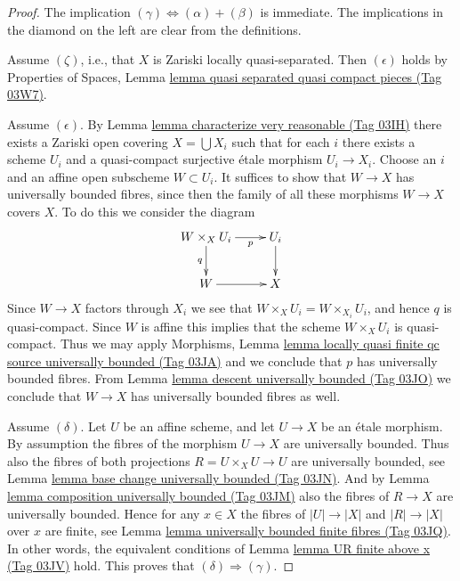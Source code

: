 \documentclass{amsart}
\theoremstyle{plain}
\theoremstyle{definition}
\theoremstyle{remark}
\numberwithin{equation}{subsection}
\begin{document}
\begin{proof}
The implication $(\gamma) \Leftrightarrow (\alpha) + (\beta)$ is immediate.
The implications in the diamond on the left are clear from the
definitions.

\medskip\noindent
Assume $(\zeta)$, i.e., that $X$ is Zariski locally quasi-separated.
Then $(\epsilon)$ holds by
Properties of Spaces, Lemma
\href{https://stacks.math.columbia.edu/tag/03W7}{lemma quasi separated quasi compact pieces (Tag 03W7)}.

\medskip\noindent
Assume $(\epsilon)$. By
Lemma \href{https://stacks.math.columbia.edu/tag/03IH}{lemma characterize very reasonable (Tag 03IH)}
there exists
a Zariski open covering $X = \bigcup X_i$ such that for each $i$
there exists a scheme $U_i$ and a quasi-compact surjective \'etale morphism
$U_i \to X_i$. Choose an $i$ and an affine open subscheme $W \subset U_i$.
It suffices to show that $W \to X$ has universally bounded fibres, since then
the family of all these morphisms $W \to X$ covers $X$.
To do this we consider the diagram
$$
\xymatrix{
W \times_X U_i \ar[r]_-p \ar[d]_q & U_i \ar[d] \\
W \ar[r] & X
}
$$
Since $W \to X$ factors through $X_i$ we see that
$W \times_X U_i = W \times_{X_i} U_i$, and hence $q$ is quasi-compact.
Since $W$ is affine this implies that the scheme $W \times_X U_i$
is quasi-compact. Thus we may apply
Morphisms, Lemma
\href{https://stacks.math.columbia.edu/tag/03JA}{lemma locally quasi finite qc source universally bounded (Tag 03JA)}
and we conclude that $p$ has universally bounded fibres. From
Lemma \href{https://stacks.math.columbia.edu/tag/03JO}{lemma descent universally bounded (Tag 03JO)}
we conclude that $W \to X$ has universally bounded fibres as well.

\medskip\noindent
Assume $(\delta)$. Let $U$ be an affine scheme, and let $U \to X$ be an \'etale
morphism. By assumption the fibres of the morphism $U \to X$ are universally
bounded. Thus also the fibres of both projections $R = U \times_X U \to U$
are universally bounded, see
Lemma \href{https://stacks.math.columbia.edu/tag/03JN}{lemma base change universally bounded (Tag 03JN)}.
And by
Lemma \href{https://stacks.math.columbia.edu/tag/03JM}{lemma composition universally bounded (Tag 03JM)}
also the fibres of $R \to X$ are universally bounded.
Hence for any $x \in X$ the fibres of $|U| \to |X|$ and $|R| \to |X|$
over $x$ are finite, see
Lemma \href{https://stacks.math.columbia.edu/tag/03JQ}{lemma universally bounded finite fibres (Tag 03JQ)}.
In other words, the equivalent conditions of
Lemma \href{https://stacks.math.columbia.edu/tag/03JV}{lemma UR finite above x (Tag 03JV)}
hold. This proves that $(\delta) \Rightarrow (\gamma)$.
\end{proof}
\end{document}
